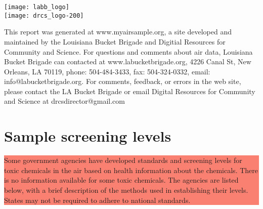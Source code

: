\documentclass{article}
\newlength\acklength
\newlength\logowidth
\newcommand{\highlightbox}[1]{\colorbox{salmon}{\parbox{\linewidth}{#1}}}
\begin{document}
     \vfill
     \parbox{\logowidth}{
       \texttt{[image: labb\_logo]}\\
       \vskip 0.1in
       \texttt{[image: drcs\_logo-200]}
     }
     \setlength\acklength{\textwidth}
     \addtolength\acklength{-\logowidth}
     \addtolength\acklength{-0.5in}
     \hskip 0.5in
     \parbox{\acklength}{
       This report was generated at www.myairsample.org, a site developed and
       maintained by the Louisiana Bucket Brigade and Digitial Resources for
       Community and Science.  For questions and comments about air data,
       Louisiana Bucket Brigade can contacted at www.labucketbrigade.org,
       4226 Canal St, New Orleans, LA 70119, phone: 504-484-3433, fax:
       504-324-0332, email: info@labucketbrigade.org.
       For comments, feedback, or errors in the web site,
       please contact the LA Bucket Brigade or email Digital Resources for
       Community and Science at drcsdirector@gmail.com
     }

\thispagestyle{empty}


\unitssection

\section*{Sample screening levels}

\highlightbox{Some government agencies have developed standards and screening levels for
toxic chemicals in the air based on health information about the chemicals.
There is no information available for some toxic chemicals. The agencies are
listed below, with a brief description of the methods used in establishing their
levels. States may not be required to adhere to national standards.}

\begin{itemize}
\end{itemize}
\end{document}
